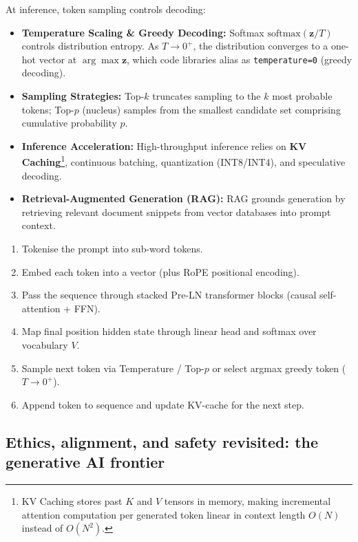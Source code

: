 \documentclass[11pt,a4paper]{article}
\begin{document}
	At inference, token sampling controls decoding:
	\begin{itemize}[nosep]
		\item \textbf{Temperature Scaling \& Greedy Decoding:} Softmax $\mathrm{softmax}(\mathbf{z}/T)$ controls distribution entropy. As $T \to 0^+$, the distribution converges to a one-hot vector at $\arg\max \mathbf{z}$, which code libraries alias as \texttt{temperature=0} (greedy decoding).
		\item \textbf{Sampling Strategies:} Top-$k$ truncates sampling to the $k$ most probable tokens; Top-$p$ (nucleus) samples from the smallest candidate set comprising cumulative probability $p$.
		\item \textbf{Inference Acceleration:} High-throughput inference relies on \textbf{KV Caching}\footnote{KV Caching stores past $K$ and $V$ tensors in memory, making incremental attention computation per generated token linear in context length $O(N)$ instead of $O(N^2)$.}, continuous batching, quantization (INT8/INT4), and speculative decoding.
		\item \textbf{Retrieval-Augmented Generation (RAG):} RAG \parencite{lewis2020} grounds generation by retrieving relevant document snippets from vector databases into prompt context.
	\end{itemize}

	\begin{keyconcept}
		\begin{enumerate}
			\item Tokenise the prompt into sub-word tokens.
			\item Embed each token into a vector (plus RoPE positional encoding).
			\item Pass the sequence through stacked Pre-LN transformer blocks (causal self-attention + FFN).
			\item Map final position hidden state through linear head and softmax over vocabulary $V$.
			\item Sample next token via Temperature / Top-$p$ or select argmax greedy token ($T \to 0^+$).
			\item Append token to sequence and update KV-cache for the next step.
		\end{enumerate}
	\end{keyconcept}

	\subsection{Ethics, alignment, and safety revisited: the generative AI frontier}
\end{document}
